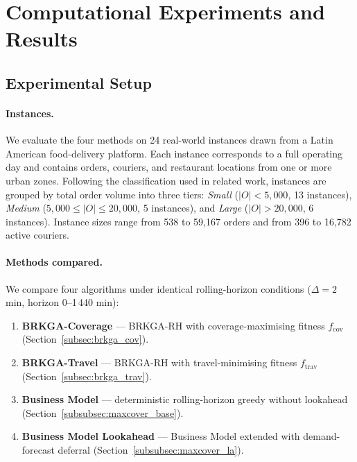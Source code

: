 
\section{Computational Experiments and Results}\label{sec:results}

\subsection{Experimental Setup}\label{subsec:setup}

\paragraph{Instances.}
We evaluate the four methods on 24 real-world instances
drawn from a Latin American food-delivery platform.
Each instance corresponds to a full operating day and
contains orders, couriers, and restaurant locations
from one or more urban zones.
Following the classification used in related work, instances are
grouped by total order volume into three tiers:
\emph{Small} ($|O| < 5{,}000$, 13 instances),
\emph{Medium} ($5{,}000 \leq |O| \leq 20{,}000$, 5 instances), and
\emph{Large} ($|O| > 20{,}000$, 6 instances).
Instance sizes range from 538 to 59{,}167 orders and from
396 to 16{,}782 active couriers.

\paragraph{Methods compared.}
We compare four algorithms under identical rolling-horizon
conditions ($\Delta = 2$ min, horizon 0--1\,440 min):
\begin{enumerate}
    \item \textbf{BRKGA-Coverage} — BRKGA-RH with coverage-maximising
          fitness $f_{\text{cov}}$ (Section~\ref{subsec:brkga_cov}).
    \item \textbf{BRKGA-Travel} — BRKGA-RH with travel-minimising
          fitness $f_{\text{trav}}$ (Section~\ref{subsec:brkga_trav}).
    \item \textbf{Business Model} — deterministic rolling-horizon
          greedy without lookahead (Section~\ref{subsubsec:maxcover_base}).
    \item \textbf{Business Model Lookahead} — Business Model extended
          with demand-forecast deferral (Section~\ref{subsubsec:maxcover_la}).
\end{enumerate}

